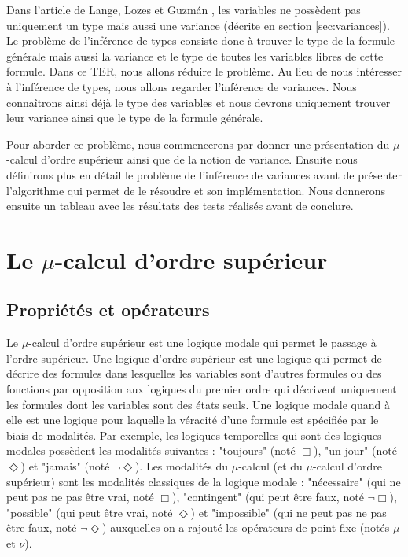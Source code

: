 \documentclass{rapport}
\theoremstyle{plain}
\theoremstyle{remark}
\theoremstyle{definition}
\begin{document}
Dans l'article de Lange, Lozes et Guzm{\'a}n \citep{lange2014model}, les variables ne possèdent pas uniquement un type mais aussi une variance (décrite en section \ref{sec:variances}). Le problème de l'inférence de types consiste donc à trouver le type de la formule générale mais aussi la variance et le type de toutes les variables libres de cette formule. Dans ce TER, nous allons réduire le problème. Au lieu de nous intéresser à l'inférence de types, nous allons regarder l'inférence de variances. Nous connaîtrons ainsi déjà le type des variables et nous devrons uniquement trouver leur variance ainsi que le type de la formule générale.  

Pour aborder ce problème, nous commencerons par donner une présentation du $\mu$-calcul d'ordre supérieur ainsi que de la notion de variance. Ensuite nous définirons plus en détail le problème de l'inférence de variances avant de présenter l'algorithme qui permet de le résoudre et son implémentation. Nous donnerons ensuite un tableau avec les résultats des tests réalisés avant de conclure.   

\section{Le $\mu$-calcul d'ordre supérieur\label{sec:muCalcul}}

\subsection{Propriétés et opérateurs\label{sec:prop&op}}

Le $\mu$-calcul d'ordre supérieur est une logique modale qui permet le passage à l'ordre supérieur. Une logique d'ordre supérieur est une logique qui permet de décrire des formules dans lesquelles les variables sont d'autres formules ou des fonctions par opposition aux logiques du premier ordre qui décrivent uniquement les formules dont les variables sont des états seuls. Une logique modale quand à elle est une logique pour laquelle la véracité d'une formule est spécifiée par le biais de modalités. Par exemple, les logiques temporelles qui sont des logiques modales possèdent les modalités suivantes : "toujours" (noté $\Box$), "un jour" (noté $\Diamond$) et "jamais" (noté $\neg \Diamond$). Les modalités du $\mu$-calcul (et du $\mu$-calcul d'ordre supérieur) sont les modalités classiques de la logique modale : "nécessaire" (qui ne peut pas ne pas être vrai, noté $\Box$), "contingent" (qui peut être faux, noté $\neg \Box$), "possible" (qui peut être vrai, noté $\Diamond$) et "impossible" (qui ne peut pas ne pas être faux, noté $\neg \Diamond$) auxquelles on a rajouté les opérateurs de point fixe (notés $\mu$ et $\nu$).
\end{document}
